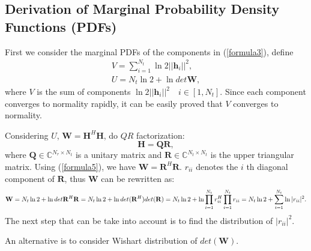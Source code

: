 \documentclass[12pt,letter,final]{article}
\begin{document}
\begin{spacing}{2.5}
\section{Derivation of Marginal Probability Density Functions (PDFs)}
First we consider the marginal PDFs of the components in (\ref{formula3}), define 
\begin{eqnarray}
V=\sum_{i=1}^{N_{t}}\ln{2||\mathbf{h}_{i}||^{2}},\\
U=N_{t}\ln{2}+\ln{det{\mathbf{W}}},
\label{formula4}
\end{eqnarray}
where $V$ is the sum of components $\ln{2||\mathbf{h}_{i}||^{2}}\quad i\in [1,N_{t}]$. Since each component converges to normality rapidly, it can be easily proved that $V$ converges to normality.

Considering $U$, $\mathbf{W}=\mathbf{H}^{H}\mathbf{H}$, do $QR$ factorization:
\begin{equation}
\mathbf{H}=\mathbf{Q}\mathbf{R},
\label{formula5} 
 \end{equation}
where $\mathbf{Q}\in\mathbb{C}^{N_{r}\times N_{t}}$ is a unitary matrix and $\mathbf{R}\in\mathbb{C}^{N_{t}\times N_{t}}$ is the upper triangular matrix. Using (\ref{formula5}), we have $\mathbf{W}=\mathbf{R}^{H}\mathbf{R}$. $r_{ii}$ denotes the $i$ th diagonal component of $\mathbf{R}$, thus $\mathbf{W}$ can be rewritten as:
\begin{equation}
\mathbf{W}=N_{t}\ln{2}+\ln{det{\mathbf{R}^{H}\mathbf{R}}}=N_{t}\ln{2}+\ln{det(\mathbf{R}^{H})det(\mathbf{R})}\\=N_{t}\ln{2}+\ln{\prod_{i=1}^{N_{t}}r_{ii}^{H}\prod_{i=1}^{N_{t}}r_{ii}}=N_{t}\ln{2}+\sum_{i=1}^{N_{t}}\ln{|r_{ii}|^{2}}.
\label{formula6}
\end{equation}    
The next step that can be take into account is to find the distribution of $|r_{ii}|^{2}$.

An alternative is to consider Wishart distribution of $det(\mathbf{W})$.


\end{spacing}
\end{document}
